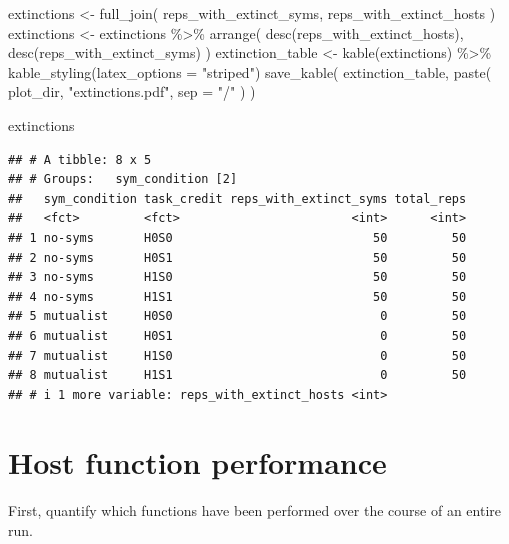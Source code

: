 \documentclass[
]{book}
\newenvironment{Shaded}{\begin{snugshade}}{\end{snugshade}}
\newcommand{\AttributeTok}[1]{\textcolor[rgb]{0.77,0.63,0.00}{#1}}
\newcommand{\FunctionTok}[1]{\textcolor[rgb]{0.00,0.00,0.00}{#1}}
\newcommand{\NormalTok}[1]{#1}
\newcommand{\OtherTok}[1]{\textcolor[rgb]{0.56,0.35,0.01}{#1}}
\newcommand{\SpecialCharTok}[1]{\textcolor[rgb]{0.00,0.00,0.00}{#1}}
\newcommand{\StringTok}[1]{\textcolor[rgb]{0.31,0.60,0.02}{#1}}
\begin{document}
\begin{Shaded}
\begin{Highlighting}[]
\NormalTok{extinctions }\OtherTok{\textless{}{-}} \FunctionTok{full\_join}\NormalTok{(}
\NormalTok{  reps\_with\_extinct\_syms,}
\NormalTok{  reps\_with\_extinct\_hosts}
\NormalTok{)}
\NormalTok{extinctions }\OtherTok{\textless{}{-}}\NormalTok{ extinctions }\SpecialCharTok{\%\textgreater{}\%}
  \FunctionTok{arrange}\NormalTok{(}
    \FunctionTok{desc}\NormalTok{(reps\_with\_extinct\_hosts), }\FunctionTok{desc}\NormalTok{(reps\_with\_extinct\_syms)}
\NormalTok{  )}
\NormalTok{extinction\_table }\OtherTok{\textless{}{-}} \FunctionTok{kable}\NormalTok{(extinctions) }\SpecialCharTok{\%\textgreater{}\%}
  \FunctionTok{kable\_styling}\NormalTok{(}\AttributeTok{latex\_options =} \StringTok{"striped"}\NormalTok{)}
\FunctionTok{save\_kable}\NormalTok{(}
\NormalTok{  extinction\_table,}
  \FunctionTok{paste}\NormalTok{(}
\NormalTok{    plot\_dir,}
    \StringTok{"extinctions.pdf"}\NormalTok{,}
    \AttributeTok{sep =} \StringTok{"/"}
\NormalTok{  )}
\NormalTok{)}

\NormalTok{extinctions}
\end{Highlighting}
\end{Shaded}

\begin{verbatim}
## # A tibble: 8 x 5
## # Groups:   sym_condition [2]
##   sym_condition task_credit reps_with_extinct_syms total_reps
##   <fct>         <fct>                        <int>      <int>
## 1 no-syms       H0S0                            50         50
## 2 no-syms       H0S1                            50         50
## 3 no-syms       H1S0                            50         50
## 4 no-syms       H1S1                            50         50
## 5 mutualist     H0S0                             0         50
## 6 mutualist     H0S1                             0         50
## 7 mutualist     H1S0                             0         50
## 8 mutualist     H1S1                             0         50
## # i 1 more variable: reps_with_extinct_hosts <int>
\end{verbatim}

\hypertarget{host-function-performance-5}{%
\section{Host function performance}\label{host-function-performance-5}}

First, quantify which functions have been performed over the course of an entire run.
\end{document}
